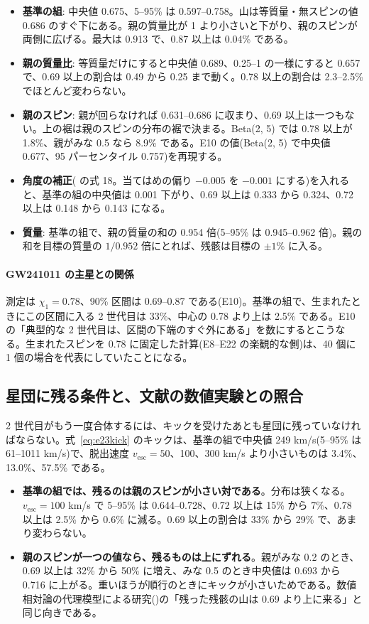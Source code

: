 \begin{itemize}
\item \textbf{基準の組}: 中央値 0.675、5--95\% は 0.597--0.758。山は等質量・無スピンの値 0.686 のすぐ下にある。親の質量比が 1 より小さいと下がり、親のスピンが両側に広げる。最大は 0.913 で、0.87 以上は 0.04\% である。
\item \textbf{親の質量比}: 等質量だけにすると中央値 0.689、0.25--1 の一様にすると 0.657 で、0.69 以上の割合は 0.49 から 0.25 まで動く。0.78 以上の割合は 2.3--2.5\% でほとんど変わらない。
\item \textbf{親のスピン}: 親が回らなければ 0.631--0.686 に収まり、0.69 以上は一つもない。上の裾は親のスピンの分布の裾で決まる。Beta(2, 5) では 0.78 以上が 1.8\%、親がみな 0.5 なら 8.9\% である。E10 の値(Beta(2, 5) で中央値 0.677、95 パーセンタイル 0.757)を再現する。
\item \textbf{角度の補正}( の式 18。当てはめの偏り $-0.005$ を $-0.001$ にする)を入れると、基準の組の中央値は 0.001 下がり、0.69 以上は 0.333 から 0.324、0.72 以上は 0.148 から 0.143 になる。
\item \textbf{質量}: 基準の組で、親の質量の和の 0.954 倍(5--95\% は 0.945--0.962 倍)。親の和を目標の質量の $1/0.952$ 倍にとれば、残骸は目標の $\pm1\%$ に入る。
\end{itemize}

\paragraph{GW241011 の主星との関係}
測定は $\chi_1=0.78$、90\% 区間は 0.69--0.87 である(E10)。基準の組で、生まれたときにこの区間に入る 2 世代目は 33\%、中心の 0.78 より上は 2.5\% である。E10 の「典型的な 2 世代目は、区間の下端のすぐ外にある」を数にするとこうなる。生まれたスピンを 0.78 に固定した計算(E8--E22 の楽観的な側)は、40 個に 1 個の場合を代表にしていたことになる。

\subsection{星団に残る条件と、文献の数値実験との照合}

2 世代目がもう一度合体するには、キックを受けたあとも星団に残っていなければならない。式~\eqref{eq:e23kick} のキックは、基準の組で中央値 249 km/s(5--95\% は 61--1011 km/s)で、脱出速度 $v_\mathrm{esc}=50$、100、300 km/s より小さいものは 3.4\%、13.0\%、57.5\% である。
\begin{itemize}
\item \textbf{基準の組では、残るのは親のスピンが小さい対である}。分布は狭くなる。$v_\mathrm{esc}=100$ km/s で 5--95\% は 0.644--0.728、0.72 以上は 15\% から 7\%、0.78 以上は 2.5\% から 0.6\% に減る。0.69 以上の割合は 33\% から 29\% で、あまり変わらない。
\item \textbf{親のスピンが一つの値なら、残るものは上にずれる}。親がみな 0.2 のとき、0.69 以上は 32\% から 50\% に増え、みな 0.5 のとき中央値は 0.693 から 0.716 に上がる。重いほうが順行のときにキックが小さいためである。数値相対論の代理模型による研究()の「残った残骸の山は 0.69 より上に来る」と同じ向きである。
\end{itemize}

